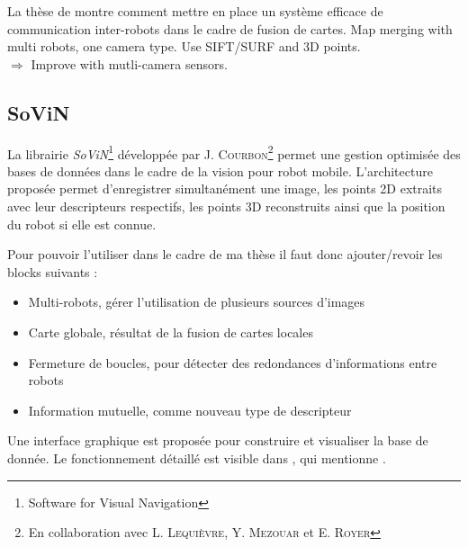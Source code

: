 La thèse de \citeauthor{Aragues11PhD} \cite{Aragues11PhD} montre comment mettre en place un système efficace de communication inter-robots dans le cadre de fusion de cartes.
Map merging with multi robots, one camera type. Use SIFT/SURF and 3D points.\\
$\Rightarrow$ Improve with mutli-camera sensors. 



\subsection{SoViN}
\label{subsub:sovin}

       
La librairie \emph{SoViN}\footnote{Software for Visual Navigation} développée par J. \textsc{Courbon}\footnote{En collaboration avec L. \textsc{Lequièvre}, Y. \textsc{Mezouar} et E. \textsc{Royer}} permet une gestion optimisée des bases de données dans le cadre de la vision pour robot mobile.
L'architecture proposée permet d'enregistrer simultanément une image, les points 2D extraits avec leur descripteurs respectifs, les points 3D reconstruits ainsi que la position du robot si elle est connue.

Pour pouvoir l'utiliser dans le cadre de ma thèse il faut donc ajouter/revoir les blocks suivants :
\begin{itemize}
\item Multi-robots, gérer l'utilisation de plusieurs sources d'images
\item Carte globale, résultat de la fusion de cartes locales
\item Fermeture de boucles, pour détecter des redondances d'informations entre robots
\item Information mutuelle, comme nouveau type de descripteur
\end{itemize}


Une interface graphique est proposée pour construire et visualiser la base de donnée.
Le fonctionnement détaillé est visible dans \cite{Lequievre08}, qui mentionne .
